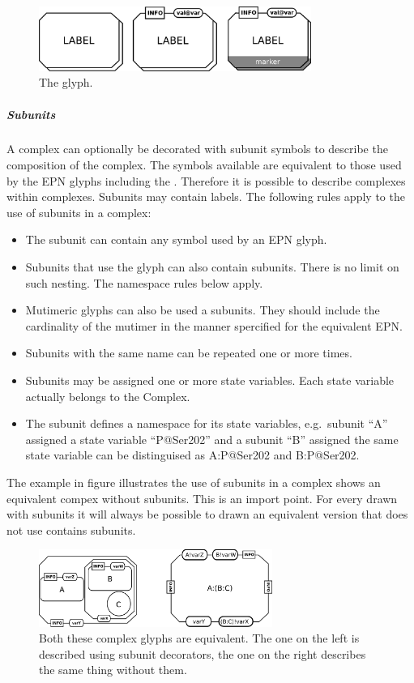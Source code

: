 \begin{figure}[H]
  \centering
  \includegraphics[width = 3.5in]{images/complexMultimerGlyph}
  \caption{The  glyph.}
  \label{fig:complexMultimer}
\end{figure}

\subparagraph{Subunits}

A complex can optionally be decorated with subunit symbols to describe
the composition of the complex. The symbols available are equivalent
to those used by the EPN glyphs including the
. Therefore it is possible to describe complexes within
complexes. Subunits may contain labels. The following rules apply to
the use of subunits in a complex:

\begin{itemize}
\item The subunit can contain any symbol used by an EPN glyph.
\item Subunits that use the  glyph can also contain
  subunits. There is no limit on such nesting. The namespace rules
  below apply.
\item Mutimeric glyphs can also be used a subunits. They should
  include the cardinality of the mutimer in the manner spercified for
  the equivalent EPN.
\item Subunits with the same name can be repeated one or more times.
\item Subunits may be assigned one or more state variables. Each state
  variable actually belongs to the Complex.
\item The subunit defines a namespace for its state variables, e.g.\,
  subunit ``A'' assigned a state variable ``P@Ser202''  and a subunit
  ``B'' assigned the same state variable can be distinguised as
  A:P@Ser202 and B:P@Ser202.
\end{itemize}

The example in figure  illustrates the use of
subunits in a complex shows an equivalent compex without
subunits. This is an import point. For every  drawn
with subunits it will always be possible to drawn an equivalent
version that does not use contains subunits.

\begin{figure}[H]
  \centering
  \includegraphics[width = 3.0in]{images/complex}
  \caption{Both these complex glyphs are equivalent. The one on the
    left is described using subunit decorators, the one on the right
    describes the same thing without them.}
  \label{fig:complexSubunits}
\end{figure}

